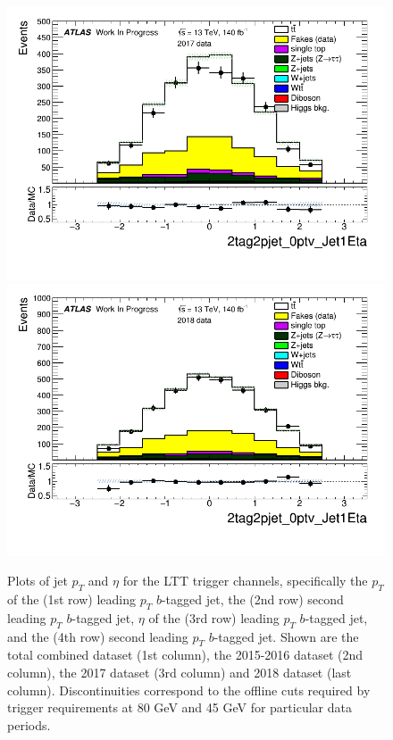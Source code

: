 \begin{figure}
\includegraphics[width=.24\textwidth]{figures/selection/LepHad_HH/2tag2pjet_0ptv_Jet1Eta_SR_ALLFAKES_LTT_2017_TRBins.png}
\includegraphics[width=.24\textwidth]{figures/selection/LepHad_HH/2tag2pjet_0ptv_Jet1Eta_SR_ALLFAKES_LTT_2018_TRBins.png}
\caption{Plots of jet $p_T$ and $\eta$ for the LTT trigger channels, specifically the $p_T$ of the (1st row) leading $p_T$ $b$-tagged jet, the (2nd row) second leading $p_T$ $b$-tagged jet, $\eta$ of the (3rd row) leading $p_T$ $b$-tagged jet, and the (4th row) second leading $p_T$ $b$-tagged jet. Shown are the total combined dataset (1st column), the 2015-2016 dataset (2nd column), the 2017 dataset (3rd column) and 2018 dataset (last column). Discontinuities correspond to the offline cuts required by trigger requirements at 80 GeV and 45 GeV for particular data periods.}
\label{fig:lh_jetpteta}
\end{figure}



\FloatBarrier